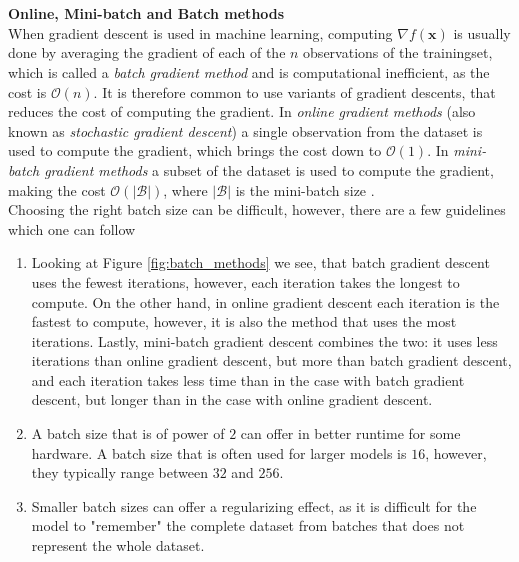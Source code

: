 \documentclass[./main.tex]{subfiles}
\begin{document}
\\
\\
\noindent \textbf{Online, Mini-batch and Batch methods} \\
\noindent When gradient descent is used in machine learning, computing $\nabla f(\bm{x})$ is usually done by averaging the gradient of each of the $n$ observations of the trainingset, which is called a \textit{batch gradient method} and is computational inefficient, as the cost is $\mathcal{O}(n)$. It is therefore common to use variants of gradient descents, that reduces the cost of computing the gradient. In \textit{online gradient methods} (also known as \textit{stochastic gradient descent}) a single observation from the dataset is used to compute the gradient, which brings the cost down to $\mathcal{O}(1)$. In \textit{mini-batch gradient methods} a subset of the dataset is used to compute the gradient, making the cost $\mathcal{O}(|\mathcal{B}|)$, where $|\mathcal{B}|$ is the mini-batch size \cite{d2l}. \\
Choosing the right batch size can be difficult, however, there are a few guidelines which one can follow \cite{EML_optimization} \cite{d2l}
\begin{enumerate}
    \item Looking at Figure \ref{fig:batch_methods} we see, that batch gradient descent uses the fewest iterations, however, each iteration takes the longest to compute. On the other hand, in online gradient descent each iteration is the fastest to compute, however, it is also the method that uses the most iterations. Lastly, mini-batch gradient descent combines the two: it uses less iterations than online gradient descent, but more than batch gradient descent, and each iteration takes less time than in the case with batch gradient descent, but longer than in the case with online gradient descent.
    \item A batch size that is of power of $2$ can offer in better runtime for some hardware. A batch size that is often used for larger models is $16$, however, they typically range between $32$ and $256$.
    \item Smaller batch sizes can offer a regularizing effect, as it is difficult for the model to "remember" the complete dataset from batches that does not represent the whole dataset.
\end{enumerate}
\end{document}
